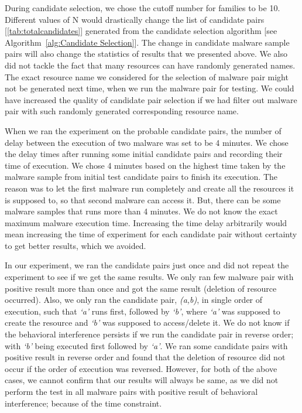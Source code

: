 During candidate selection, we chose the cutoff number for families to be 10.
Different values of N would drastically change the list of candidate pairs [\autoref{tab:totalcandidates}] generated from the candidate selection algorithm [see Algorithm~\autoref{alg:Candidate Selection}].
The change in candidate malware sample pairs will also change the statistics of results that we presented above.
We also did not tackle the fact that many resources can have randomly generated names.
The exact resource name we considered for the selection of malware pair might not be generated next time, when we run the malware pair for testing.
We could have increased the quality of candidate pair selection if we had filter out malware pair with such randomly generated corresponding resource name.

When we ran the experiment on the probable candidate pairs, the number of delay between the execution of two malware was set to be 4 minutes.
We chose the delay times after running some initial candidate pairs and recording their time of execution.
We chose 4 minutes based on the highest time taken by the malware sample from initial test candidate pairs to finish its execution.
The reason was to let the first malware run completely and create all the resources it is supposed to, so that second malware can access it.
But, there can be some malware samples that runs more than 4 minutes.
We do not know the exact maximum malware execution time.
Increasing the time delay arbitrarily would mean increasing the time of experiment for each candidate pair without certainty to get better results, which we avoided.

In our experiment, we ran the candidate pairs just once and did not repeat the experiment to see if we get the same results.
We only ran few malware pair with positive result more than once and got the same result (deletion of resource occurred).
Also, we only ran the candidate pair, \emph{(a,b)}, in single order of execution, such that \emph{`a'} runs first, followed by \emph{`b'}, where \emph{`a'} was supposed to create the resource and \emph{`b'} was supposed to access/delete it.
We do not know if the behavioral interference persists if we run the candidate pair in reverse order; with \emph{`b'} being executed first followed by \emph{`a'}.
We ran some candidate pairs with positive result in reverse order and found that the deletion of resource did not occur if the order of execution was reversed.
However, for both of the above cases, we cannot confirm that our results will always be same, as we did not perform the test in all malware pairs with positive result of behavioral interference; because of the time constraint.

